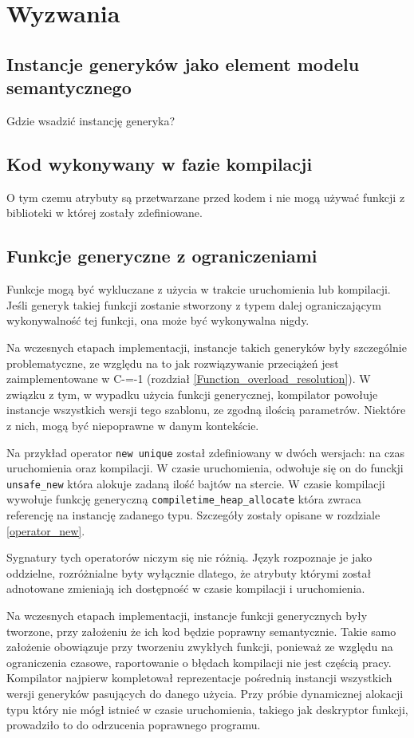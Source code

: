 \section{Wyzwania}
\subsection{Instancje generyków jako element modelu semantycznego}
Gdzie wsadzić instancję generyka?

\subsection{Kod wykonywany w fazie kompilacji}
O tym czemu atrybuty są przetwarzane przed kodem i nie mogą używać funkcji z biblioteki w której zostały zdefiniowane.

\subsection{Funkcje generyczne z ograniczeniami}

Funkcje mogą być wykluczane z użycia w trakcie uruchomienia lub kompilacji. Jeśli generyk takiej funkcji zostanie stworzony z typem dalej ograniczającym wykonywalność tej funkcji, ona może być wykonywalna nigdy.

Na wczesnych etapach implementacji, instancje takich generyków były szczególnie problematyczne, ze względu na to jak rozwiązywanie przeciążeń jest zaimplementowane w C-=-1 (rozdział \ref{Function_overload_resolution}).
W związku z tym, w wypadku użycia funkcji generycznej, kompilator powołuje instancje wszystkich wersji tego szablonu, ze zgodną ilością parametrów.
Niektóre z nich, mogą być niepoprawne w danym kontekście. 

Na przykład operator \lstinline{new unique} został zdefiniowany w dwóch wersjach: na czas uruchomienia oraz kompilacji.
W czasie uruchomienia, odwołuje się on do funckji \lstinline{unsafe_new} która alokuje zadaną ilość bajtów na stercie.
W czasie kompilacji wywołuje funkcję generyczną \lstinline{compiletime_heap_allocate} która zwraca referencję na instancję zadanego typu.
Szczegóły zostały opisane w rozdziale \ref{operator_new}.

Sygnatury tych operatorów niczym się nie różnią.
Język rozpoznaje je jako oddzielne, rozróżnialne byty wyłącznie dlatego, że atrybuty którymi został adnotowane zmieniają ich dostępność w czasie kompilacji i uruchomienia.

Na wczesnych etapach implementacji, instancje funkcji generycznych były tworzone, przy założeniu że ich kod będzie poprawny semantycznie.
Takie samo założenie obowiązuje przy tworzeniu zwykłych funkcji, ponieważ ze względu na ograniczenia czasowe, raportowanie o błędach kompilacji nie jest częścią pracy.
Kompilator najpierw kompletował reprezentacje pośrednią instancji wszystkich wersji generyków pasujących do danego użycia.
Przy próbie dynamicznej alokacji typu który nie mógł istnieć w czasie uruchomienia, takiego jak deskryptor funkcji, prowadziło to do odrzucenia poprawnego programu.

